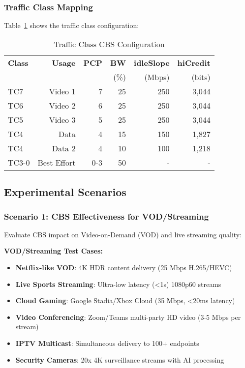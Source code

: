 \documentclass[10pt, journal, compsoc]{IEEEtran}
\begin{document}
\subsubsection{Traffic Class Mapping}

Table~\ref{tab:tc_mapping} shows the traffic class configuration:

\begin{table}[h]
\centering
\caption{Traffic Class CBS Configuration}
\label{tab:tc_mapping}
\begin{tabular}{lrrrrr}
\toprule
\textbf{Class} & \textbf{Usage} & \textbf{PCP} & \textbf{BW} & \textbf{idleSlope} & \textbf{hiCredit} \\
 & & & (\%) & (Mbps) & (bits) \\
\midrule
TC7 & Video 1 & 7 & 25 & 250 & 3,044 \\
TC6 & Video 2 & 6 & 25 & 250 & 3,044 \\
TC5 & Video 3 & 5 & 25 & 250 & 3,044 \\
TC4 & Data & 4 & 15 & 150 & 1,827 \\
TC4 & Data 2 & 4 & 10 & 100 & 1,218 \\
TC3-0 & Best Effort & 0-3 & 50 & - & - \\
\bottomrule
\end{tabular}
\end{table}

\subsection{Experimental Scenarios}

\subsubsection{Scenario 1: CBS Effectiveness for VOD/Streaming}

Evaluate CBS impact on Video-on-Demand (VOD) and live streaming quality:

\textbf{VOD/Streaming Test Cases:}
\begin{itemize}
    \item \textbf{Netflix-like VOD}: 4K HDR content delivery (25 Mbps H.265/HEVC)
    \item \textbf{Live Sports Streaming}: Ultra-low latency (<1s) 1080p60 streams
    \item \textbf{Cloud Gaming}: Google Stadia/Xbox Cloud (35 Mbps, <20ms latency)
    \item \textbf{Video Conferencing}: Zoom/Teams multi-party HD video (3-5 Mbps per stream)
    \item \textbf{IPTV Multicast}: Simultaneous delivery to 100+ endpoints
    \item \textbf{Security Cameras}: 20x 4K surveillance streams with AI processing
\end{itemize}
\end{document}
